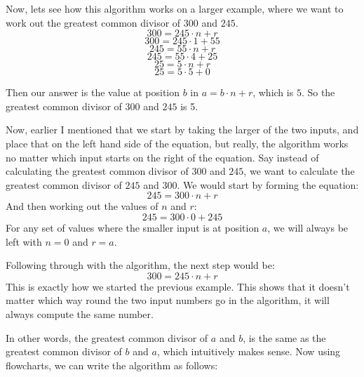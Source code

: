 \documentclass{article}
\begin{document}
Now, lets see how this algorithm works on a larger example, where we want to work out the greatest common divisor of $300$ and $245$.
$$300 = 245 \cdot n + r$$
$$300 = 245 \cdot 1 + 55$$
$$245 = 55 \cdot n + r$$
$$245 = 55 \cdot 4 + 25$$
$$25 = 5 \cdot n + r$$
$$25 = 5 \cdot 5 + 0$$

Then our answer is the value at position $b$ in $a = b \cdot n + r$, which is $5$. So the greatest common divisor of $300$ and $245$ is 5.

Now, earlier I mentioned that we start by taking the larger of the two inputs, and place that on the left hand side of the equation, but really, the algorithm works no matter which input starts on the right of the equation. Say instead of calculating the greatest common divisor of $300$ and $245$, we want to calculate the greatest common divisor of $245$ and $300$. We would start by forming the equation:
$$245 = 300 \cdot n + r$$
And then working out the values of $n$ and $r$:
$$245 = 300 \cdot 0 + 245$$
For any set of values where the smaller input is at position $a$, we will always be left with $n = 0$ and $r = a$.

Following through with the algorithm, the next step would be:
$$300 = 245 \cdot n + r$$
This is exactly how we started the previous example. This shows that it doesn't matter which way round the two input numbers go in the algorithm, it will always compute the same number.

In other words, the greatest common divisor of $a$ and $b$, is the same as the greatest common divisor of $b$ and $a$, which intuitively makes sense.
\clearpage
Now using flowcharts, we can write the algorithm as follows:
\end{document}
